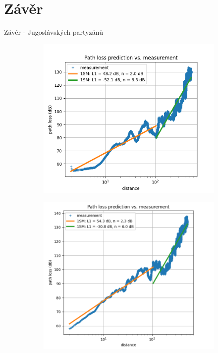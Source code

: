 \documentclass[aspectratio=169, 12pt, hyperref={unicode}]{beamer}
\begin{document}
\section{Závěr}
\begin{frame}{Závěr - Jugoslávských partyzánů}
	\begin{figure}[!ht]
		\centering
		\begin{subfigure}[b]{.45\textwidth}
			\centering
			\includegraphics[width=\textwidth]{src/partyzanu-od-vysilace-4.png}
		\end{subfigure}
		\begin{subfigure}[b]{.45\textwidth}
			\centering
			\includegraphics[width=\textwidth]{src/partyzanu-k-vysilaci-4.png}
		\end{subfigure}
	\end{figure}
\end{frame}

\end{document}
